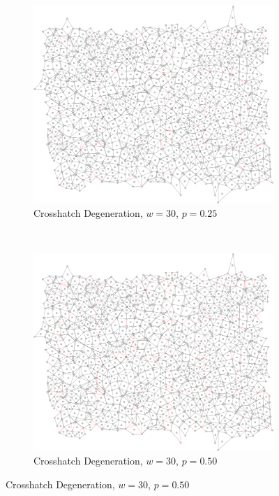 \documentclass[a4paper,11pt]{report}
\begin{document}
\begin{figure}[htp]
\centering
\begin{subfigure}[t]{0.4\textwidth}
  \includegraphics[width=\textwidth]{ch6_figs/cross_hatch_p25_w30}
  \caption{Crosshatch Degeneration, $w=30$, $p=0.25$}

\end{subfigure}
~
\begin{subfigure}[t]{0.4\textwidth}
  \centering
  \includegraphics[width=\textwidth]{ch6_figs/cross_hatch_p50_w30}
  \caption{Crosshatch Degeneration, $w=30$, $p=0.50$}


\end{subfigure}
\end{figure}
\end{document}
